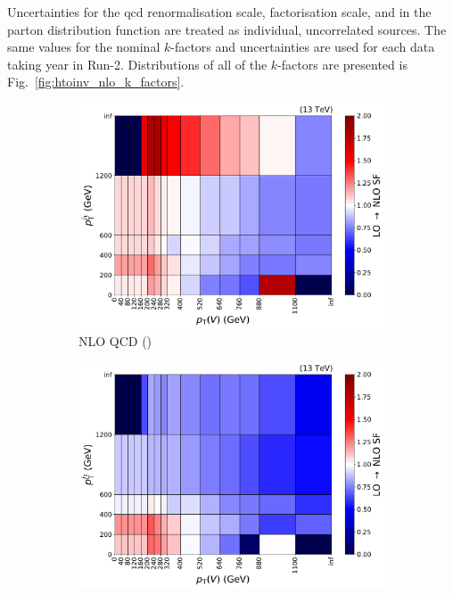Uncertainties for the \acrshort{qcd} renormalisation scale, factorisation scale, and in the parton distribution function are treated as individual, uncorrelated sources. The same values for the nominal $k$-factors and uncertainties are used for each data taking year in Run-2. Distributions of all of the $k$-factors are presented is Fig.~\ref{fig:htoinv_nlo_k_factors}.

\begin{figure}[htbp]
    \centering
    \begin{subfigure}[b]{0.32\textwidth}
        \includegraphics[width=\textwidth]{figures/nlo_k_factors/2D_wjets.pdf}
        \caption{NLO QCD (\PW)}
    \end{subfigure}
    \hfill
    \begin{subfigure}[b]{0.32\textwidth}
        \includegraphics[width=\textwidth]{figures/nlo_k_factors/2D_zll.pdf}

\end{subfigure}
\end{figure}
